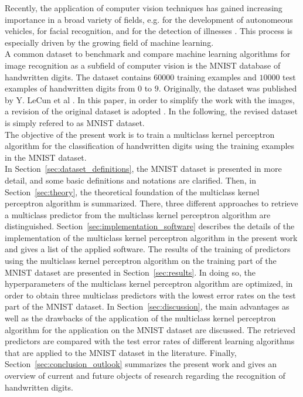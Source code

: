 Recently, the application of computer vision techniques has gained increasing importance in a broad variety of fields, e.g. for the development of autonomeous vehicles, for facial recognition, and for the detection of illnesses \cite{autonomeous2020, emotion2020, medicine2021}. This process is especially driven by the growing field of machine learning. \\

A common dataset to benchmark and compare machine learning algorithms for image recognition as a subfield of computer vision is the MNIST database of handwritten digits. The dataset contains $60000$ training examples and $10000$ test examples of handwritten digits from $0$ to $9$. Originally, the dataset was published by Y. LeCun et al \cite{MNIST}. In this paper, in order to simplify the work with the images, a revision of the original dataset is adopted \cite{KaggleData}. In the following, the revised dataset is simply refered to as MNIST dataset. \\

The objective of the present work is to train a multiclass kernel perceptron algorithm for the classification of handwritten digits using the training examples in the MNIST dataset. \\

In Section~\ref{sec:dataset_definitions}, the MNIST dataset is presented in more detail, and some basic definitions and notations are clarified. Then, in Section~\ref{sec:theory}, the theoretical foundation of the multiclass kernel perceptron algorithm is summarized. There, three different approaches to retrieve a multiclass predictor from the multiclass kernel perceptron algorithm are distinguished. Section~\ref{sec:implementation_software} describes the details of the implementation of the multiclass kernel perceptron algorithm in the present work and gives a list of the applied software. The results of the training of predictors using the multiclass kernel perceptron algorithm on the training part of the MNIST dataset are presented in Section~\ref{sec:results}. In doing so, the hyperparameters of the multiclass kernel perceptron algorithm are optimized, in order to obtain three multiclass predictors with the lowest error rates on the test part of the MNIST dataset. In Section~\ref{sec:discussion}, the main advantages as well as the drawbacks of the application of the multiclass kernel perceptron algorithm for the application on the MNIST dataset are discussed. The retrieved predictors are compared with the test error rates of different learning algorithms that are applied to the MNIST dataset in the literature. Finally, Section~\ref{sec:conclusion_outlook} summarizes the present work and gives an overview of current and future objects of research regarding the recognition of handwritten digits.